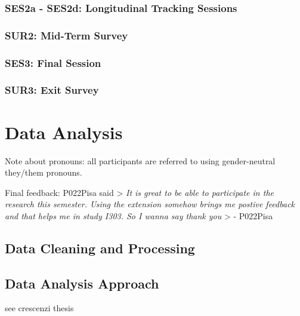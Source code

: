 \documentclass[letterpaper, nobind]{templates/ociamthesis}
\begin{document}
\hypertarget{ses2a---ses2d-longitudinal-tracking-sessions}{%
\subsection{SES2a - SES2d: Longitudinal Tracking Sessions}\label{ses2a---ses2d-longitudinal-tracking-sessions}}

\hypertarget{sec-method-sur2}{%
\subsection{SUR2: Mid-Term Survey}\label{sec-method-sur2}}

\hypertarget{ses3-final-session}{%
\subsection{SES3: Final Session}\label{ses3-final-session}}

\hypertarget{sur3-exit-survey}{%
\subsection{SUR3: Exit Survey}\label{sur3-exit-survey}}

\hypertarget{data-analysis}{%
\chapter{Data Analysis}\label{data-analysis}}

Note about pronouns:
all participants are referred to using gender-neutral they/them pronouns.

Final feedback:
P022Pisa said
\textgreater{} \emph{It is great to be able to participate in the research this semester. Using the extension somehow brings me postive feedback and that helps me in study I303. So I wanna say thank you}
\textgreater{} - P022Pisa

\hypertarget{data-cleaning-and-processing}{%
\section{Data Cleaning and Processing}\label{data-cleaning-and-processing}}

\hypertarget{data-analysis-approach}{%
\section{Data Analysis Approach}\label{data-analysis-approach}}

see crescenzi thesis
\end{document}
